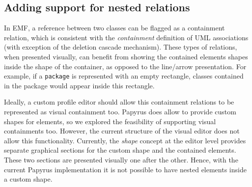 \subsection{Adding support for nested relations}
In EMF, a reference between two classes can be flagged as a containment relation, which is consistent with the \emph{containment} definition of UML associations (with exception of the deletion cascade mechanism).
These types of relations, when presented visually, can benefit from showing the contained elements shapes inside the shape of the container, as opposed to the line/arrow presentation.
For example, if a \texttt{package} is represented with an empty rectangle, classes contained in the package would appear inside this rectangle.

Ideally, a custom profile editor should allow this containment relations to be represented as visual containment too.
Papyrus does allow to provide custom shapes for elements, so we explored the feasibility of supporting visual containments too.
However, the current structure of the visual editor does not allow this functionality.
Currently, the \emph{shape} concept at the editor level provides separate graphical sections for the custom shape and the contained elements.
These two sections are presented visually one after the other.
Hence, with the current Papyrus implementation it is not possible to have nested elements inside a custom shape.

